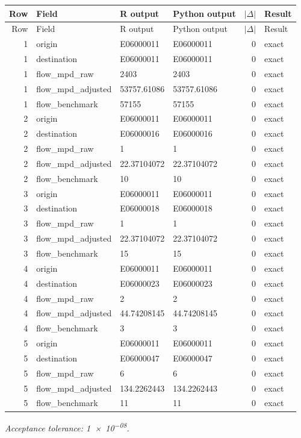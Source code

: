 \documentclass[10pt]{article}
\begin{document}
\small
\begin{longtable}{@{}r p{}p{}p{}rl@{}}
\toprule
Row & Field & R output & Python output & $|\Delta|$ & Result \\
\midrule
\endfirsthead
\toprule
Row & Field & R output & Python output & $|\Delta|$ & Result \\
\midrule
\endhead
1 & origin & E06000011 & E06000011 & 0 & exact \\
1 & destination & E06000011 & E06000011 & 0 & exact \\
1 & flow\_\allowbreak{}mpd\_\allowbreak{}raw & 2403 & 2403 & 0 & exact \\
1 & flow\_\allowbreak{}mpd\_\allowbreak{}adjusted & 53757.61086 & 53757.61086 & 0 & exact \\
1 & flow\_\allowbreak{}benchmark & 57155 & 57155 & 0 & exact \\
2 & origin & E06000011 & E06000011 & 0 & exact \\
2 & destination & E06000016 & E06000016 & 0 & exact \\
2 & flow\_\allowbreak{}mpd\_\allowbreak{}raw & 1 & 1 & 0 & exact \\
2 & flow\_\allowbreak{}mpd\_\allowbreak{}adjusted & 22.37104072 & 22.37104072 & 0 & exact \\
2 & flow\_\allowbreak{}benchmark & 10 & 10 & 0 & exact \\
3 & origin & E06000011 & E06000011 & 0 & exact \\
3 & destination & E06000018 & E06000018 & 0 & exact \\
3 & flow\_\allowbreak{}mpd\_\allowbreak{}raw & 1 & 1 & 0 & exact \\
3 & flow\_\allowbreak{}mpd\_\allowbreak{}adjusted & 22.37104072 & 22.37104072 & 0 & exact \\
3 & flow\_\allowbreak{}benchmark & 15 & 15 & 0 & exact \\
4 & origin & E06000011 & E06000011 & 0 & exact \\
4 & destination & E06000023 & E06000023 & 0 & exact \\
4 & flow\_\allowbreak{}mpd\_\allowbreak{}raw & 2 & 2 & 0 & exact \\
4 & flow\_\allowbreak{}mpd\_\allowbreak{}adjusted & 44.74208145 & 44.74208145 & 0 & exact \\
4 & flow\_\allowbreak{}benchmark & 3 & 3 & 0 & exact \\
5 & origin & E06000011 & E06000011 & 0 & exact \\
5 & destination & E06000047 & E06000047 & 0 & exact \\
5 & flow\_\allowbreak{}mpd\_\allowbreak{}raw & 6 & 6 & 0 & exact \\
5 & flow\_\allowbreak{}mpd\_\allowbreak{}adjusted & 134.2262443 & 134.2262443 & 0 & exact \\
5 & flow\_\allowbreak{}benchmark & 11 & 11 & 0 & exact \\
\bottomrule
\end{longtable}
\normalsize
\textit{Acceptance tolerance: \num{1e-08}.}
\end{document}
